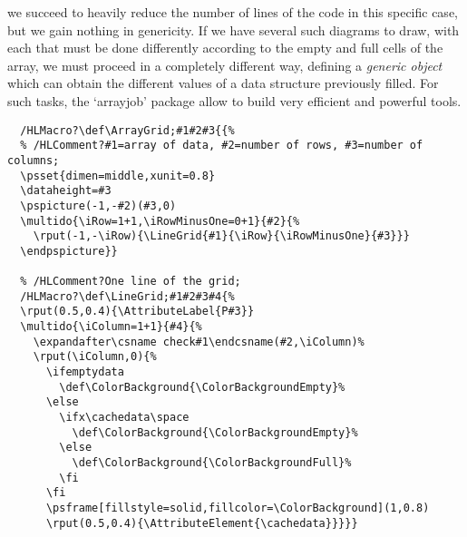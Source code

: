 \documentclass{article}
\newcommand{\ArrayJobPackage}{`\textsf{arrayjob}'}
\begin{document}
\vspace{2mm}
\noindent we succeed to heavily reduce the number of lines of the code in this
specific case, but we gain nothing in genericity. If we have several such
diagrams to draw, with each that must be done differently according to the
empty and full cells of the array, we must proceed in a completely different
way, defining a \emph{generic object} which can obtain the different values of
a data structure previously filled. For such tasks, the \ArrayJobPackage{}
package allow to build very efficient and powerful tools.

\begin{Verbatim}[commandchars=/?;]
  % /HLComment?The grid;
  /HLMacro?\def\ArrayGrid;#1#2#3{{%
  % /HLComment?#1=array of data, #2=number of rows, #3=number of columns;
  \psset{dimen=middle,xunit=0.8}
  \dataheight=#3
  \pspicture(-1,-#2)(#3,0)
  \multido{\iRow=1+1,\iRowMinusOne=0+1}{#2}{%
    \rput(-1,-\iRow){\LineGrid{#1}{\iRow}{\iRowMinusOne}{#3}}}
  \endpspicture}}

  % /HLComment?One line of the grid;
  /HLMacro?\def\LineGrid;#1#2#3#4{%
  \rput(0.5,0.4){\AttributeLabel{P#3}}
  \multido{\iColumn=1+1}{#4}{%
    \expandafter\csname check#1\endcsname(#2,\iColumn)%
    \rput(\iColumn,0){%
      \ifemptydata
        \def\ColorBackground{\ColorBackgroundEmpty}%
      \else
        \ifx\cachedata\space
          \def\ColorBackground{\ColorBackgroundEmpty}%
        \else
          \def\ColorBackground{\ColorBackgroundFull}%
        \fi
      \fi
      \psframe[fillstyle=solid,fillcolor=\ColorBackground](1,0.8)
      \rput(0.5,0.4){\AttributeElement{\cachedata}}}}}
\end{Verbatim}

\def\ArrayGrid#1#2#3{{%
\psset{dimen=middle,xunit=0.8}
\dataheight=#3
\pspicture(-1,-#2)(#3,0)
\multido{\iRow=1+1,\iRowMinusOne=0+1}{#2}{%
  \rput(-1,-\iRow){\LineGrid{#1}{\iRow}{\iRowMinusOne}{#3}}}
\endpspicture}}

\def\LineGrid#1#2#3#4{%
\rput(0.3,0.4){\AttributeLabel{P#3}}
\multido{\iColumn=1+1}{#4}{%
  \expandafter\csname check#1\endcsname(#2,\iColumn)%
  \rput(\iColumn,0){%
    \ifemptydata
      \def\ColorBackground{\ColorBackgroundEmpty}%
    \else
      \ifx\cachedata\space
        \def\ColorBackground{\ColorBackgroundEmpty}%
      \else
        \def\ColorBackground{\ColorBackgroundFull}%
      \fi
    \fi
    \psframe[fillstyle=solid,fillcolor=\ColorBackground](1,0.8)
    \rput(0.5,0.4){\AttributeElement{\cachedata}}}}}
\end{document}
